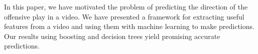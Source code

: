 \documentclass{article} %
\begin{document}
In this paper, we have motivated the problem of predicting the direction of the offensive play in a video. We have presented a framework for extracting useful features from a video and using them with machine learning to make predictions. Our results using boosting and decision trees yield promising accurate predictions.

%
%
%
%
%
%
%
%
\end{document}
